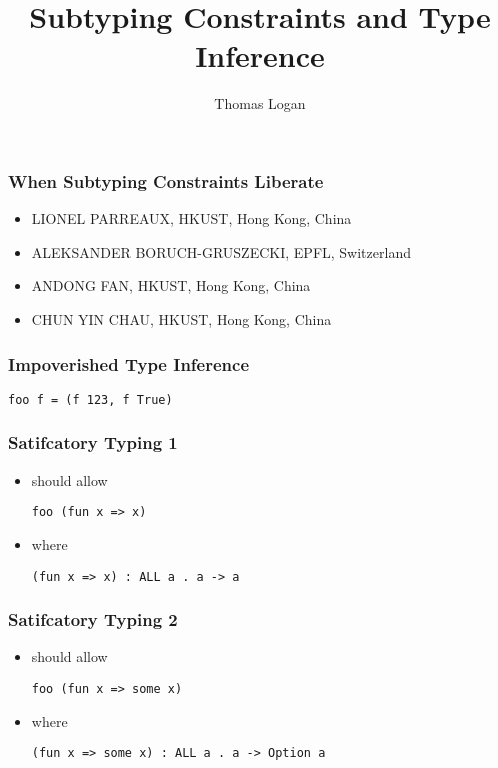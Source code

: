 \documentclass{beamer}
\title{Subtyping Constraints and Type Inference}
\author{Thomas Logan}
\begin{document}
\begin{frame}
  \titlepage
\end{frame}

\begin{frame}
  \frametitle{When Subtyping Constraints Liberate}

  \begin{itemize}
  \item LIONEL PARREAUX, HKUST, Hong Kong, China
  \item ALEKSANDER BORUCH-GRUSZECKI, EPFL, Switzerland
  \item ANDONG FAN, HKUST, Hong Kong, China
  \item CHUN YIN CHAU, HKUST, Hong Kong, China
  \end{itemize}
\end{frame}

\begin{frame}[fragile]
  \frametitle{Impoverished Type Inference}

  \begin{lstlisting}
foo f = (f 123, f True)
  \end{lstlisting}

\end{frame}


\begin{frame}[fragile]
  \frametitle{Satifcatory Typing 1}

  \begin{itemize}
  \item should allow
  \begin{lstlisting}
foo (fun x => x)
  \end{lstlisting}
  \item where
  \begin{lstlisting}
(fun x => x) : ALL a . a -> a
  \end{lstlisting}
  \end{itemize}

\end{frame}


\begin{frame}[fragile]
  \frametitle{Satifcatory Typing 2}

  \begin{itemize}
  \item should allow
  \begin{lstlisting}
foo (fun x => some x)
  \end{lstlisting}
  \item where
  \begin{lstlisting}
(fun x => some x) : ALL a . a -> Option a
  \end{lstlisting}
  \end{itemize}

\end{frame}
\end{document}
